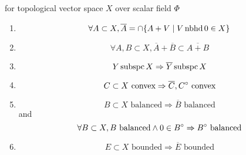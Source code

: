 \begin{thm}\label{thm:01:tvs-char-00}
  for topological vector space $X$ over scalar field $\Phi$
  \begin{enumerate}[label=(\alph*)]
  \item\label{thm:01:tvs-char-00:1}
    \[
    \forall A\subset X, \overline{A} =
    \cap\{A+V\mid V\operatorname{nbhd} 0\in X\}
    \]
  \item\label{thm:01:tvs-char-00:2}
    \[
    \forall A, B\subset X,
    \overline{A}+\overline{B} \subset \overline{A + B}
    \]
  \item\label{thm:01:tvs-char-00:3}
    \[
    Y\operatorname{subspc} X \Rightarrow \overline{Y}\operatorname{subspc} X
    \]
  \item\label{thm:01:tvs-char-00:4}
    \[
    C\subset X \text{ convex}
    \Rightarrow
    \overline{C}, {C}^{\circ} \text{ convex}
    \]
  \item\label{thm:01:tvs-char-00:5}
    \[
    B\subset X\text{ balanced} \Rightarrow
    \overline{B}\text{ balanced}
    \]
    and
    \[
    \forall B\subset X,
    B\text{ balanced}\land 0\in{B}^{\circ}\Rightarrow
    {B}^{\circ}\text{ balanced}
    \]
  \item\label{thm:01:tvs-char-00:6}
    \[
    E\subset X\text{ bounded} \Rightarrow
    \overline{E} \text{ bounded}
    \]
  \end{enumerate}
\end{thm}
